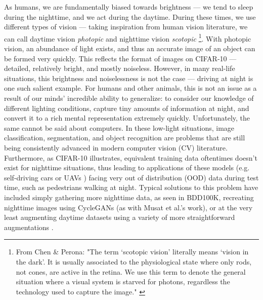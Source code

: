 \documentclass{article}
\begin{document}
As humans, we are fundamentally biased towards brightness --- we tend to sleep during the nighttime, and we act during the daytime. During these times, we use different types of vision --- taking inspiration from human vision literature, we can call daytime vision \textit{photopic} and nighttime vision \textit{scotopic} \footnote{From Chen \& Perona: "The term ‘scotopic vision’ literally means ‘vision in the dark’. It is usually associated to the physiological state where only rods, not cones, are active in the retina. We use this term to denote the general situation where a visual system is starved for photons, regardless the technology used to capture the image." \cite{chenScotopic2015}}. With photopic vision, an abundance of light exists, and thus an accurate image of an object can be formed very quickly. This reflects the format of images on CIFAR-10 --- detailed, relatively bright, and mostly noiseless. However, in many real-life situations, this brightness and noiselessness is not the case --- driving at night is one such salient example. For humans and other animals, this is not an issue as a result of our minds' incredible ability to generalize: to consider our knowledge of different lighting conditions, capture tiny amounts of information at night, and convert it to a rich mental representation extremely quickly. Unfortunately, the same cannot be said about computers. In these low-light situations, image classification, segmentation, and object recognition are problems that are still being consistently advanced in modern computer vision (CV) literature. Furthermore, as CIFAR-10 illustrates, equivalent training data oftentimes doesn't exist for nighttime situations, thus leading to applications of these models (e.g. self-driving cars or UAVs \cite{darkLighter2021}) facing very out of distribution (OOD) data during test time, such as pedestrians walking at night. Typical solutions to this problem have included simply gathering more nighttime data, as seen in BDD100K, recreating nighttime images using CycleGANs (as with Musat et al.'s work), or at the very least augmenting daytime datasets using a variety of more straightforward augmentations \cite{yu2020bdd100k, multiweather2021, surveyDataAugmentation}.
\end{document}
